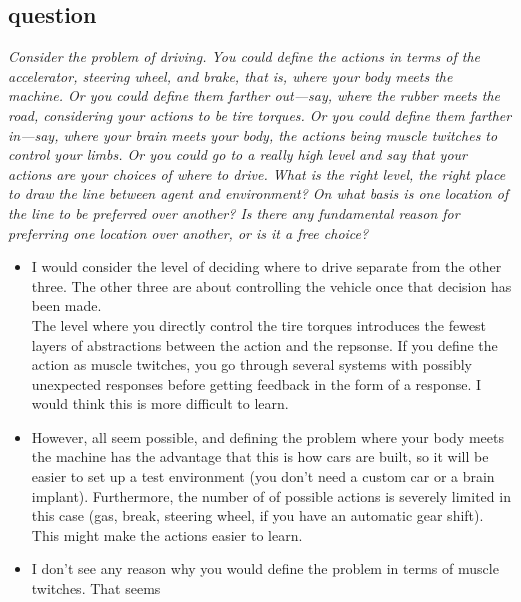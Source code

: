 \documentclass{article}
\begin{document}
\subsection{question}
\textit{Consider the problem of driving. You could define the actions in terms of the accelerator, steering wheel, and brake, that is, where your body meets the machine. Or you could define them farther out—say, where the rubber meets the road, considering your actions to be tire torques. Or you could define them farther in—say, where your brain meets your body, the actions being muscle twitches to control your limbs. Or you could go to a really high level and say that your actions are your choices of where to drive. What is the right level, the right place to draw the line between agent and environment? On what basis is one location of the line to be preferred over another? Is there any fundamental reason for preferring one location over another, or is it a free choice?}
\begin{itemize}
\item I would consider the level of deciding where to drive separate from the other three. The other three are about controlling the vehicle once that decision has been made.\\
The level where you directly control the tire torques introduces the fewest layers of abstractions between the action and the repsonse. If you define the action as muscle twitches, you go through several systems with possibly unexpected responses before getting feedback in the form of a response. I would think this is more difficult to learn.
\item However, all seem possible, and defining the problem where your body meets the machine has the advantage that this is how cars are built, so it will be easier to set up a test environment (you don't need a custom car or a brain implant). Furthermore, the number of of possible actions is severely limited in this case (gas, break, steering wheel, if you have an automatic gear shift). This might make the actions easier to learn.
\item I don't see any reason why you would define the problem in terms of muscle twitches. That seems
\end{itemize}
\end{document}

